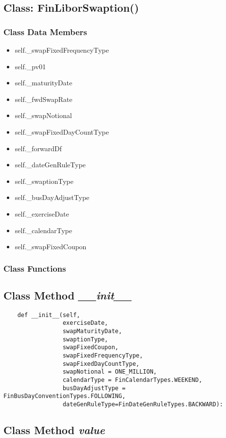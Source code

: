 \documentclass[twoside,11pt]{book}
\begin{document}
\subsection{Class: FinLiborSwaption()}


\subsubsection{Class Data Members}
\begin{itemize}
\item{self.\_swapFixedFrequencyType}
\item{self.\_pv01}
\item{self.\_maturityDate}
\item{self.\_fwdSwapRate}
\item{self.\_swapNotional}
\item{self.\_swapFixedDayCountType}
\item{self.\_forwardDf}
\item{self.\_dateGenRuleType}
\item{self.\_swaptionType}
\item{self.\_busDayAdjustType}
\item{self.\_exerciseDate}
\item{self.\_calendarType}
\item{self.\_swapFixedCoupon}
\end{itemize}

\subsubsection{Class Functions}

\subsection{Class Method {\it \_\_init\_\_}}


\begin{lstlisting}
    def __init__(self, 
                 exerciseDate,
                 swapMaturityDate,
                 swaptionType,
                 swapFixedCoupon,
                 swapFixedFrequencyType,
                 swapFixedDayCountType,
                 swapNotional = ONE_MILLION, 
                 calendarType = FinCalendarTypes.WEEKEND,
                 busDayAdjustType = FinBusDayConventionTypes.FOLLOWING,
                 dateGenRuleType=FinDateGenRuleTypes.BACKWARD):
\end{lstlisting}

\subsection{Class Method {\it value}}
\end{document}
